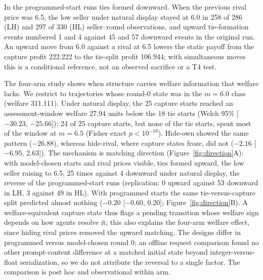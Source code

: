 \documentclass[sigconf,review,anonymous]{acmart}
\begin{document}
In the programmed-start runs ties formed downward. When the previous rival price was 6.5, the low seller under natural display stayed at 6.0 in 258 of 286 (LH) and 297 of 330 (HL) seller--round observations, and upward tie-formation events numbered 1 and 4 against 45 and 57 downward events in the original run. An upward move from 6.0 against a rival at 6.5 lowers the static payoff from the capture profit 222.222 to the tie-split profit 106.944; with simultaneous moves this is a conditional reference, not an observed sacrifice or a T4 test.

The four-arm study shows when structure carries welfare information that welfare lacks. We restrict to trajectories whose round-0 state was in the $m=6.0$ class (welfare 311.111). Under natural display, the 25 capture starts reached an assessment-window welfare 27.94 units below the 18 tie starts (Welch 95\% [$-30.23$, $-25.66$]); 24 of 25 capture starts, but none of the tie starts, spent most of the window at $m=6.5$ (Fisher exact $p<10^{-10}$). Hide-own showed the same pattern ($-26.88$), whereas hide-rival, where capture states froze, did not ($-2.16$ [$-6.95$, 2.63]). The mechanism is matching direction (Figure~\ref{fig:direction}A): with model-chosen starts and rival prices visible, ties formed upward, the low seller raising to 6.5, 25 times against 4 downward under natural display, the reverse of the programmed-start runs (replication: 0 upward against 53 downward in LH, 3 against 49 in HL). With programmed starts the same tie-versus-capture split predicted almost nothing ($-0.20$ [$-0.60$, 0.20]; Figure~\ref{fig:direction}B). A welfare-equivalent capture state thus flags a pending transition whose welfare sign depends on how agents resolve it; this also explains the four-arm welfare effect, since hiding rival prices removed the upward matching. The designs differ in programmed versus model-chosen round 0; an offline request comparison found no other prompt-content difference at a matched initial state beyond integer-versus-float serialization, so we do not attribute the reversal to a single factor. The comparison is post hoc and observational within arm.
\end{document}

